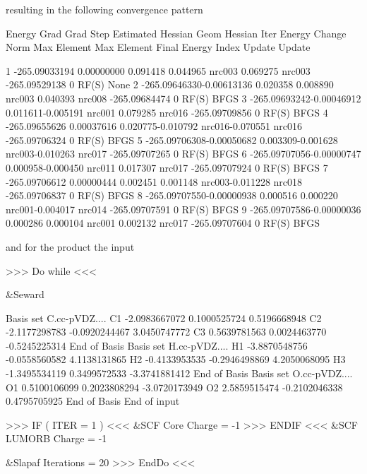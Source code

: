 resulting in the following convergence pattern

\begin{sourcelisting}
                      Energy     Grad     Grad          Step           Estimated  Hessian Geom Hessian
Iter     Energy       Change     Norm      Max  Element  Max  Element  Final Energy Index Update Update

 1   -265.09033194 0.00000000 0.091418 0.044965 nrc003 0.069275  nrc003 -265.09529138  0  RF(S)   None
 2   -265.09646330-0.00613136 0.020358 0.008890 nrc003 0.040393  nrc008 -265.09684474  0  RF(S)   BFGS
 3   -265.09693242-0.00046912 0.011611-0.005191 nrc001 0.079285  nrc016 -265.09709856  0  RF(S)   BFGS
 4   -265.09655626 0.00037616 0.020775-0.010792 nrc016-0.070551  nrc016 -265.09706324  0  RF(S)   BFGS
 5   -265.09706308-0.00050682 0.003309-0.001628 nrc003-0.010263  nrc017 -265.09707265  0  RF(S)   BFGS
 6   -265.09707056-0.00000747 0.000958-0.000450 nrc011 0.017307  nrc017 -265.09707924  0  RF(S)   BFGS
 7   -265.09706612 0.00000444 0.002451 0.001148 nrc003-0.011228  nrc018 -265.09706837  0  RF(S)   BFGS
 8   -265.09707550-0.00000938 0.000516 0.000220 nrc001-0.004017  nrc014 -265.09707591  0  RF(S)   BFGS
 9   -265.09707586-0.00000036 0.000286 0.000104 nrc001 0.002132  nrc017 -265.09707604  0  RF(S)   BFGS
\end{sourcelisting}
 
and for the product the input

\begin{inputlisting}
>>> Do while <<<

&Seward

Basis set
C.cc-pVDZ....
C1            -2.0983667072        0.1000525724        0.5196668948
C2            -2.1177298783       -0.0920244467        3.0450747772
C3             0.5639781563        0.0024463770       -0.5245225314
End of Basis
Basis set
H.cc-pVDZ....
H1            -3.8870548756       -0.0558560582        4.1138131865
H2            -0.4133953535       -0.2946498869        4.2050068095
H3            -1.3495534119        0.3499572533       -3.3741881412
End of Basis
Basis set
O.cc-pVDZ....
O1             0.5100106099        0.2023808294       -3.0720173949
O2             2.5859515474       -0.2102046338        0.4795705925
End of Basis
End of input

>>> IF ( ITER = 1 ) <<<
 &SCF
Core
Charge = -1
>>> ENDIF <<<
 &SCF 
LUMORB
Charge = -1

 &Slapaf 
Iterations = 20
>>> EndDo <<<
\end{inputlisting}

